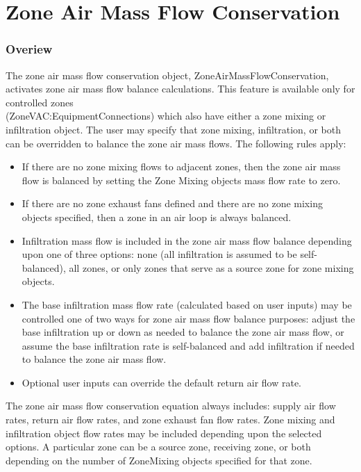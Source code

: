 \section{Zone Air Mass Flow Conservation}\label{zone-air-mass-flow-conservation}

\subsubsection{Overiew}\label{overiew}

The zone air mass flow conservation object, ZoneAirMassFlowConservation, activates zone air mass flow balance calculations. This feature is available only for controlled zones \\
(ZoneVAC:EquipmentConnections) which also have either a zone mixing or infiltration object. The user may specify that zone mixing, infiltration, or both can be overridden to balance the zone air mass flows. The following rules apply:

\begin{itemize}
\tightlist
\item
  If there are no zone mixing flows to adjacent zones, then the zone air mass flow is balanced by setting the Zone Mixing objects mass flow rate to zero.
\item
  If there are no zone exhaust fans defined and there are no zone mixing objects specified, then a zone in an air loop is always balanced.
\item
  Infiltration mass flow is included in the zone air mass flow balance depending upon one of three options: none (all infiltration is assumed to be self-balanced), all zones, or only zones that serve as a source zone for zone mixing objects.
\item
  The base infiltration mass flow rate (calculated based on user inputs) may be controlled one of two ways for zone air mass flow balance purposes: adjust the base infiltration up or down as needed to balance the zone air mass flow, or assume the base infiltration rate is self-balanced and add infiltration if needed to balance the zone air mass flow.
\item
  Optional user inputs can override the default return air flow rate.
\end{itemize}

The zone air mass flow conservation equation always includes: supply air flow rates, return air flow rates, and zone exhaust fan flow rates. Zone mixing and infiltration object flow rates may be included depending upon the selected options. A particular zone can be a source zone, receiving zone, or both depending on the number of ZoneMixing objects specified for that zone.

